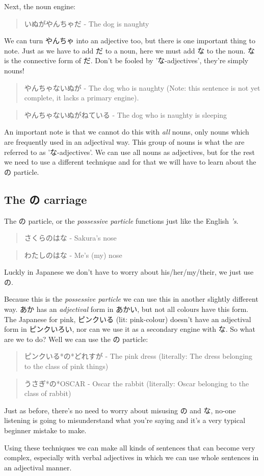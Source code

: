 \documentclass[11pt]{article}
\begin{document}
Next, the noun engine:
\begin{quote}
いぬがやんちゃだ - The dog is naughty
\end{quote}
We can turn やんちゃ into an adjective too, but there is one important thing to note. Just as we have to add だ to a noun, here we must add な to the noun. な is the connective form of だ. Don't be fooled by 'な-adjectives', they're simply nouns!
\begin{quote}
やんちゃないぬが - The dog who is naughty (Note: this sentence is not yet complete, it lacks a primary engine).
\end{quote}
\begin{quote}
やんちゃないぬがねている - The dog who is naughty is sleeping
\end{quote}

An important note is that we cannot do this with \emph{all} nouns, only nouns which are frequently used in an adjectival way. This group of nouns is what the are referred to as 'な-adjectives'. We can use all nouns as adjectives, but for the rest we need to use a different technique and for that we will have to learn about the の particle.

\subsection{The の carriage}
\label{sec:org834a1ca}
The の particle, or the \emph{possessive particle} functions just like the English \emph{'s}.
\begin{quote}
さくらのはな - Sakura's nose
\end{quote}
\begin{quote}
わたしのはな - Me's (my) nose
\end{quote}
Luckly in Japanese we don't have to worry about his/her/my/their, we just use の.

Because this is the \emph{possessive particle} we can use this in another slightly different way. あか has an \emph{adjectival} form in あかい, but not all colours have this form. The Japanese for pink, ピンクいる (lit: pink-colour) doesn't have an adjectival form in ピンクいろい, nor can we use it as a secondary engine with な. So what are we to do? Well we can use the の particle:
\begin{quote}
ピンクいる*の*どれすが - The pink dress (literally: The dress belonging to the class of pink things)
\end{quote}
\begin{quote}
うさぎ*の*OSCAR - Oscar the rabbit (literally: Oscar belonging to the class of rabbit)
\end{quote}

Just as before, there's no need to worry about misusing の and な, no-one listening is going to misunderstand what you're saying and it's a very typical beginner mistake to make.

Using these techniques we can make all kinds of sentences that can become very complex, especially with verbal adjectives in which we can use whole sentences in an adjectival manner.
\end{document}
